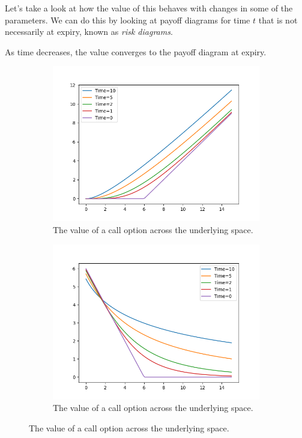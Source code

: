 \documentclass{article}
\begin{document}
    Let's take a look at how the value of this behaves with changes in some of the parameters. We can do this by looking at payoff diagrams for time $t$ that is not necessarily at expiry, known as \textit{risk diagrams}. 

    \begin{theorem}
      As time decreases, the value converges to the payoff diagram at expiry. 
      \begin{figure}[H]
        \centering
        \begin{subfigure}[b]{0.48\textwidth}
        \centering
          \includegraphics[width=\textwidth]{img/bs_call_wrt_time.png}
          \caption{The value of a call option across the underlying space. }
          \label{fig:bs_call_wrt_time}
        \end{subfigure}
        \hfill 
        \begin{subfigure}[b]{0.48\textwidth}
        \centering
          \includegraphics[width=\textwidth]{img/bs_put_wrt_time.png}
          \caption{The value of a call option across the underlying space. }
          \label{fig:bs_put_wrt_time}
        \end{subfigure}
        \label{fig:bs_wrt_time}
      \end{figure}
    \end{theorem}
\end{document}
